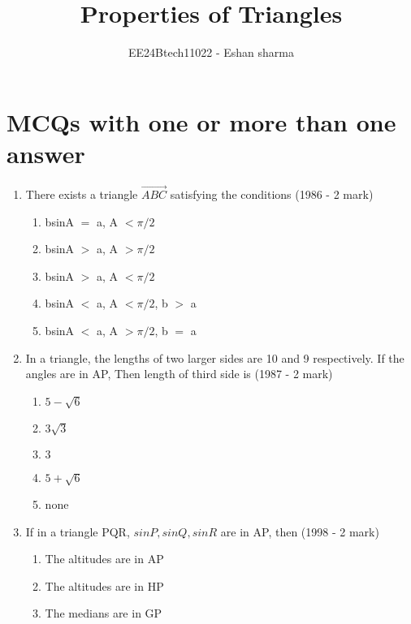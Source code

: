 \documentclass[journal,12pt,twocolumn]{IEEEtran}
\theoremstyle{remark}
\begin{document}

\vspace{3cm}

\title{Properties of Triangles}
\author{EE24Btech11022 - Eshan sharma}
\maketitle
\newpage
\bigskip

\renewcommand{\thefigure}{\theenumi}
\renewcommand{\thetable}{\theenumi}


\section{MCQs with one or more than one answer}
\begin{enumerate}
	\item There exists a triangle $\vec{ABC}$ satisfying the conditions
    \hfill{(1986 - 2 mark)}
    \begin{enumerate}
    \item bsinA $=$ a, A $<\pi/2$
    \item bsinA $>$ a, A $>\pi/2$
    \item bsinA $>$ a, A $<\pi/2$
    \item bsinA $<$ a, A $<\pi/2$, b $>$ a
    \item bsinA $<$ a, A $>\pi/2$, b $=$ a
    \end{enumerate}
    \item In a triangle, the lengths of two larger sides are 10 and 9 respectively. If the angles are in AP, Then length of third side is
    \hfill{(1987 - 2 mark)}
    \begin{multicols}{2}
    \begin{enumerate}
    \item $5-\sqrt{6}$ 
    \item $3\sqrt{3}$
    \item $3$
    \item $5+\sqrt{6}$ 
    \item none
    \end{enumerate}
    \end{multicols}
    \item If in a triangle PQR, $sinP, sinQ, sinR$ are in AP, then
    \hfill{(1998 - 2 mark)}
    \begin{enumerate}
    \item The altitudes are in AP
    \item The altitudes are in HP
    \item The medians are in GP

\end{enumerate}
\end{enumerate}
\end{document}

